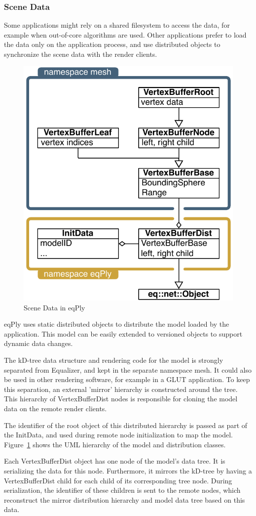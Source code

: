 \documentclass[10pt,a4]{scrartcl}
\newcommand{\fig}[1]{Figure~\ref{#1}}
\begin{document}
\subsubsection{\label{sSceneData}Scene Data}

Some applications might rely on a shared filesystem to access the data,
for example when out-of-core algorithms are used. Other applications
prefer to load the data only on the application process, and use
distributed objects to synchronize the scene data with the render
clients.

\begin{figure}
  \includegraphics[width=.382\textwidth]{images/modelDist.pdf}
  {\caption{\small\label{fModelDist}Scene Data in eqPly}}
\end{figure}
\textsf{eqPly} uses static distributed objects to distribute the model
loaded by the application. This model can be easily extended to
versioned objects to support dynamic data changes.

The kD-tree data structure and rendering code for the model is strongly
separated from Equalizer, and kept in the separate namespace
\textsf{mesh}. It could also be used in other rendering software, for
example in a GLUT application. To keep this separation, an external
'mirror' hierarchy is constructed around the tree. This hierarchy of
\textsf{VertexBufferDist} nodes is responsible for cloning the model
data on the remote render clients.

The identifier of the root object of this distributed hierarchy is passed
as part of the \textsf{InitData}, and used during remote node
initialization to map the model. \fig{fModelDist} shows the UML
hierarchy of the model and distribution classes.

Each \textsf{VertexBufferDist} object has one node of the model's data
tree. It is serializing the data for this node. Furthermore, it mirrors
the kD-tree by having a \textsf{VertexBufferDist} child for each child
of its corresponding tree node. During serialization, the identifier of
these children is sent to the remote nodes, which reconstruct the mirror
distribution hierarchy and model data tree based on this data.
\end{document}
